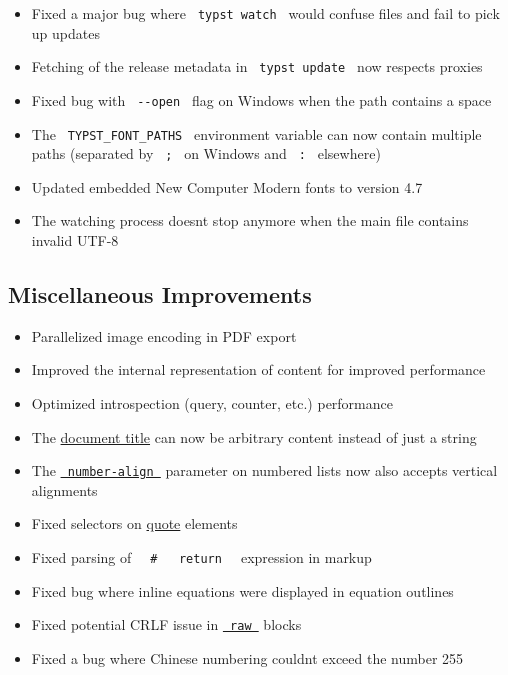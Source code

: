 \begin{itemize}
\tightlist
\item
  Fixed a major bug where \texttt{\ typst\ watch\ } would confuse files
  and fail to pick up updates
\item
  Fetching of the release metadata in \texttt{\ typst\ update\ } now
  respects proxies
\item
  Fixed bug with \texttt{\ -\/-open\ } flag on Windows when the path
  contains a space
\item
  The \texttt{\ TYPST\_FONT\_PATHS\ } environment variable can now
  contain multiple paths (separated by \texttt{\ ;\ } on Windows and
  \texttt{\ :\ } elsewhere)
\item
  Updated embedded New Computer Modern fonts to version 4.7
\item
  The watching process doesn\textquotesingle t stop anymore when the
  main file contains invalid UTF-8
\end{itemize}

\subsection{Miscellaneous
Improvements}\label{miscellaneous-improvements}

\begin{itemize}
\tightlist
\item
  Parallelized image encoding in PDF export
\item
  Improved the internal representation of content for improved
  performance
\item
  Optimized introspection (query, counter, etc.) performance
\item
  The \href{/docs/reference/model/document/\#parameters-title}{document
  title} can now be arbitrary content instead of just a string
\item
  The
  \href{/docs/reference/model/enum/\#parameters-number-align}{\texttt{\ number-align\ }}
  parameter on numbered lists now also accepts vertical alignments
\item
  Fixed selectors on \href{/docs/reference/model/quote/}{quote} elements
\item
  Fixed parsing of
  \texttt{\ }{\texttt{\ \#\ }}\texttt{\ }{\texttt{\ return\ }}\texttt{\ }
  expression in markup
\item
  Fixed bug where inline equations were displayed in equation outlines
\item
  Fixed potential CRLF issue in
  \href{/docs/reference/text/raw/}{\texttt{\ raw\ }} blocks
\item
  Fixed a bug where Chinese numbering couldn\textquotesingle t exceed
  the number 255
\end{itemize}

